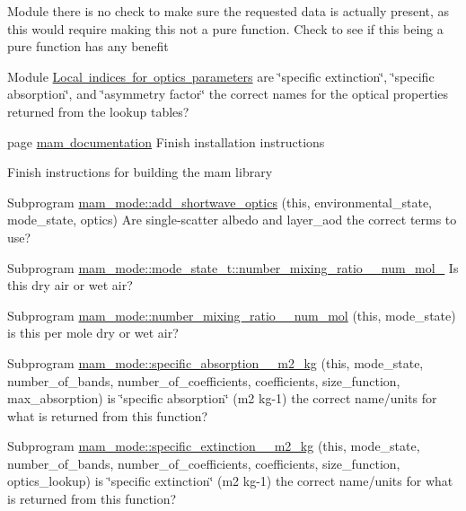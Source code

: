 
\begin{DoxyRefList}
\item[Module \mbox{\hyperlink{namespacemam__optics__lookup_amgrp01747264fe7bf50731df0522c351974e}{}} ]\label{todo__todo000011}%
%
there is no check to make sure the requested data is actually present, as this would require making this not a pure function. Check to see if this being a pure function has any benefit  
\item[Module \mbox{\hyperlink{namespacemam__optics__lookup_amgrp1d1234ebe5af757beddabdb4075372a5}{Local indices for optics parameters}} ]\label{todo__todo000010}%
%
are \char`\"{}specific extinction\char`\"{}, \char`\"{}specific absorption\char`\"{}, and \char`\"{}asymmetry factor\char`\"{} the correct names for the optical properties returned from the lookup tables?


\item[page \mbox{\hyperlink{index}{mam documentation}} ]\label{todo__todo000001}%
%
Finish installation instructions

\label{todo__todo000002}%
%
Finish instructions for building the mam library 
\item[Subprogram \mbox{\hyperlink{namespacemam__mode_ab9b38f854035795ee9ca700c989e93a4}{mam\+\_\+mode\+::add\+\_\+shortwave\+\_\+optics}} (this, environmental\+\_\+state, mode\+\_\+state, optics)]\label{todo__todo000004}%
%
Are single-\/scatter albedo and layer\+\_\+aod the correct terms to use?  
\item[Subprogram \mbox{\hyperlink{structmam__mode_1_1mode__state__t_a7ac10b68c2ff25b49d2cda9825adc915}{mam\+\_\+mode\+::mode\+\_\+state\+\_\+t\+::number\+\_\+mixing\+\_\+ratio\+\_\+\+\_\+num\+\_\+mol\+\_\+}} ]\label{todo__todo000003}%
%
Is this dry air or wet air?  
\item[Subprogram \mbox{\hyperlink{namespacemam__mode_a9b672a9f0c3a4eff42da6c9187117c2f}{mam\+\_\+mode\+::number\+\_\+mixing\+\_\+ratio\+\_\+\+\_\+num\+\_\+mol}} (this, mode\+\_\+state)]\label{todo__todo000005}%
%
is this per mole dry or wet air?  
\item[Subprogram \mbox{\hyperlink{namespacemam__mode_a7a7ccd5c378b5181b4bcbe5f2c5a2e6c}{mam\+\_\+mode\+::specific\+\_\+absorption\+\_\+\+\_\+m2\+\_\+kg}} (this, mode\+\_\+state, number\+\_\+of\+\_\+bands, number\+\_\+of\+\_\+coefficients, coefficients, size\+\_\+function, max\+\_\+absorption)]\label{todo__todo000006}%
%
is \char`\"{}specific absorption\char`\"{} (m2 kg-\/1) the correct name/units for what is returned from this function?  
\item[Subprogram \mbox{\hyperlink{namespacemam__mode_aa0ed60cc0da1e1bf74ee66e8d83106ef}{mam\+\_\+mode\+::specific\+\_\+extinction\+\_\+\+\_\+m2\+\_\+kg}} (this, mode\+\_\+state, number\+\_\+of\+\_\+bands, number\+\_\+of\+\_\+coefficients, coefficients, size\+\_\+function, optics\+\_\+lookup)]\label{todo__todo000007}%
%
is \char`\"{}specific extinction\char`\"{} (m2 kg-\/1) the correct name/units for what is returned from this function? 


\end{DoxyRefList}
